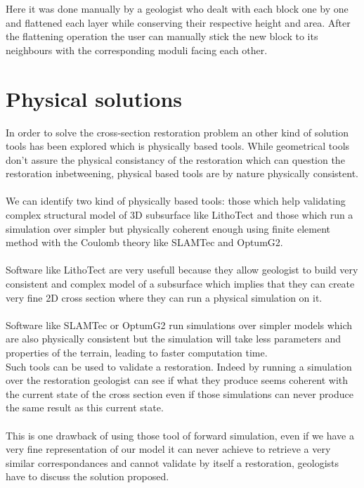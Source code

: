 \documentclass[12pt, a4paper]{memoir} %
\begin{document}
 Here it was done manually by a geologist who dealt with each block one by one and flattened each layer while conserving their respective height and area. After the flattening operation the user can manually stick the new block to its neighbours with the corresponding moduli facing each other.

\section{Physical solutions}

In order to solve the cross-section restoration problem an other kind of solution tools has been explored which is physically based tools. While geometrical tools don't assure the physical consistancy of the restoration which can question the restoration inbetweening, physical based tools are by nature physically consistent.\\\\
 We can identify two kind of physically based tools: those which help validating complex structural model of 3D subsurface like LithoTect \cite{LithoTec} and those which run a simulation over simpler but physically coherent enough using finite element method with the Coulomb theory like SLAMTec and OptumG2.\\\\ 
Software like LithoTect are very usefull because they allow geologist to build very consistent and complex model of a subsurface which implies that they can create very fine 2D cross section where they can run a physical simulation on it.\\\\
Software like SLAMTec or OptumG2 run simulations over simpler models which are also physically consistent but the simulation will take less parameters and properties of the terrain, leading to faster computation time.\\
Such tools can be used to validate a restoration. Indeed by running a simulation over the restoration geologist can see if what they produce seems coherent with the current state of the cross section even if those simulations can never produce the same result as this current state.\\\\
 This is one drawback of using those tool of forward simulation, even if we have a very fine representation of our model it can never achieve to retrieve a very similar correspondances and cannot validate by itself a restoration, geologists have to discuss the solution proposed.\\\\ 
\end{document}
